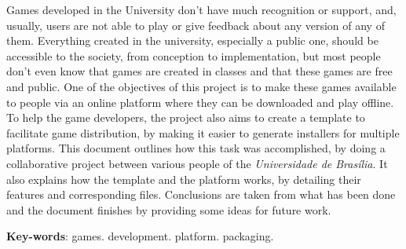 \begin{resumo}[Abstract]
Games developed in the University don't have much recognition or support, and, usually, users are not able to play or give feedback about any version of any of them. Everything created in the university, especially a public one, should be accessible to the society, from conception to implementation, but most people don't even know that games are created in classes and that these games are free and public. One of the objectives of this project is to make these games available to people via an online platform where they can be downloaded and play offline. To help the game developers, the project also aims to create a template to facilitate game distribution, by making it easier to generate installers for multiple platforms. This document outlines how this task was accomplished, by doing a collaborative project between various people of the \textit{Universidade de Brasília}. It also explains how the template and the platform works, by detailing their features and corresponding files. Conclusions are taken from what has been done and the document finishes by providing some ideas for future work.

   \vspace{\onelineskip}

   \noindent
   \textbf{Key-words}: games. development. platform. packaging.
\end{resumo}
